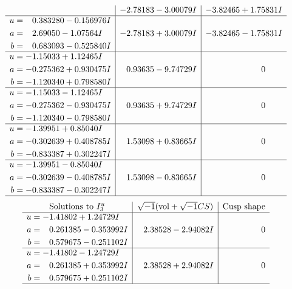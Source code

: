 \documentclass[1p]{elsarticle_modified}
\theoremstyle{definition}
\newcommand{\I}{\sqrt{-1}}
\begin{document}
$$\begin{array}{c|c|c}
 & -2.78183 - 3.00079 I & -3.82465 + 1.75831 I \\ \hline\begin{aligned}
u &= \phantom{-}0.383280 - 0.156976 I \\
a &= \phantom{-}2.69050 - 1.07564 I \\
b &= \phantom{-}0.683093 - 0.525840 I\end{aligned}
 & -2.78183 + 3.00079 I & -3.82465 - 1.75831 I \\ \hline\begin{aligned}
u &= -1.15033 + 1.12465 I \\
a &= -0.275362 + 0.930475 I \\
b &= -1.120340 + 0.798580 I\end{aligned}
 & \phantom{-}0.93635 - 9.74729 I & \phantom{-0.000000 } 0 \\ \hline\begin{aligned}
u &= -1.15033 - 1.12465 I \\
a &= -0.275362 - 0.930475 I \\
b &= -1.120340 - 0.798580 I\end{aligned}
 & \phantom{-}0.93635 + 9.74729 I & \phantom{-0.000000 } 0 \\ \hline\begin{aligned}
u &= -1.39951 + 0.85040 I \\
a &= -0.302639 + 0.408785 I \\
b &= -0.833387 + 0.302247 I\end{aligned}
 & \phantom{-}1.53098 + 0.83665 I & \phantom{-0.000000 } 0 \\ \hline\begin{aligned}
u &= -1.39951 - 0.85040 I \\
a &= -0.302639 - 0.408785 I \\
b &= -0.833387 - 0.302247 I\end{aligned}
 & \phantom{-}1.53098 - 0.83665 I & \phantom{-0.000000 } 0\\
 \hline 
 \end{array}$$\newpage$$\begin{array}{c|c|c}  
\text{Solutions to }I^u_{3}& \I (\text{vol} + \sqrt{-1}CS) & \text{Cusp shape}\\
 \hline 
\begin{aligned}
u &= -1.41802 + 1.24729 I \\
a &= \phantom{-}0.261385 - 0.353992 I \\
b &= \phantom{-}0.579675 - 0.251102 I\end{aligned}
 & \phantom{-}2.38528 - 2.94082 I & \phantom{-0.000000 } 0 \\ \hline\begin{aligned}
u &= -1.41802 - 1.24729 I \\
a &= \phantom{-}0.261385 + 0.353992 I \\
b &= \phantom{-}0.579675 + 0.251102 I\end{aligned}
 & \phantom{-}2.38528 + 2.94082 I & \phantom{-0.000000 } 0\\
 \hline 
 \end{array}$$\newpage\newpage\renewcommand{\arraystretch}{1}
\end{document}
